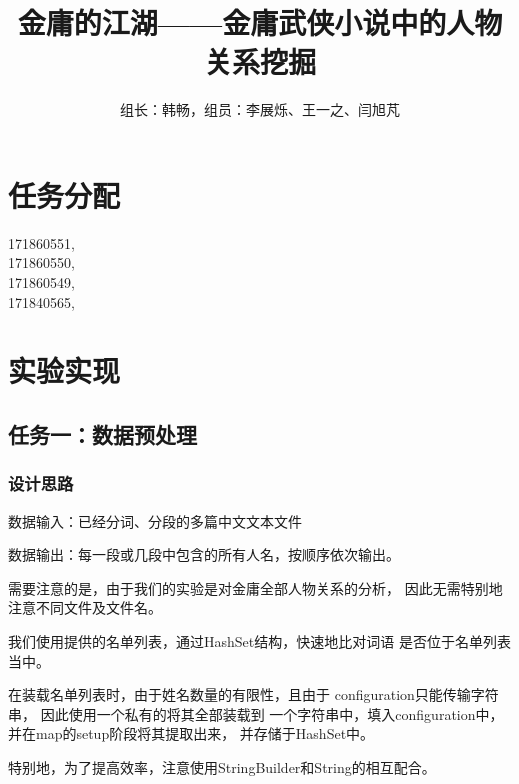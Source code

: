 \documentclass[a4paper,UTF8]{article}
\author{组长：韩畅，组员：李展烁、王一之、闫旭芃}
\numberwithin{equation}{section}
\begin{document}
{}
\title{金庸的江湖——金庸武侠小说中的人物关系挖掘}
\maketitle

\section{任务分配}
{171860551, }\\ \indent
{171860550, }\\ \indent
{171860549, }\\ \indent
{171840565, }


\section{实验实现}
\subsection{任务一：数据预处理}
\subsubsection{设计思路}
数据输入：已经分词、分段的多篇中文文本文件
\par 数据输出：每一段或几段中包含的所有人名，按顺序依次输出。
\par 需要注意的是，由于我们的实验是对金庸全部人物关系的分析，
因此无需特别地注意不同文件及文件名。
\par 我们使用提供的名单列表，通过HashSet结构，快速地比对词语
是否位于名单列表当中。
\par 在装载名单列表时，由于姓名数量的有限性，且由于
configuration只能传输字符串，
因此使用一个私有的将其全部装载到
一个字符串中，填入configuration中，
并在map的setup阶段将其提取出来，
并存储于HashSet中。
\par 特别地，为了提高效率，注意使用StringBuilder和String的相互配合。
\end{document}

